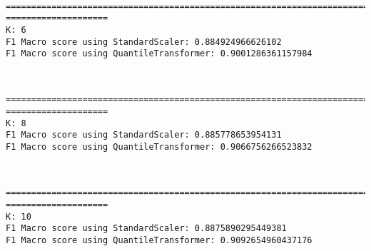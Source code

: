 \documentclass[11pt]{article}
\begin{document}
    \begin{center}
    \end{center}
    { \hspace*{\fill} \\}
    
    \begin{Verbatim}[commandchars=\\\{\}]
================================================================================
====================
K: 6
F1 Macro score using StandardScaler: 0.884924966626102
F1 Macro score using QuantileTransformer: 0.9001286361157984
    \end{Verbatim}

    \begin{center}
    \end{center}
    { \hspace*{\fill} \\}
    
    \begin{Verbatim}[commandchars=\\\{\}]
================================================================================
====================
K: 8
F1 Macro score using StandardScaler: 0.885778653954131
F1 Macro score using QuantileTransformer: 0.9066756266523832
    \end{Verbatim}

    \begin{center}
    \end{center}
    { \hspace*{\fill} \\}
    
    \begin{Verbatim}[commandchars=\\\{\}]
================================================================================
====================
K: 10
F1 Macro score using StandardScaler: 0.8875890295449381
F1 Macro score using QuantileTransformer: 0.9092654960437176
    \end{Verbatim}

    \begin{center}
    \end{center}
    { \hspace*{\fill} \\}
    
\end{document}
